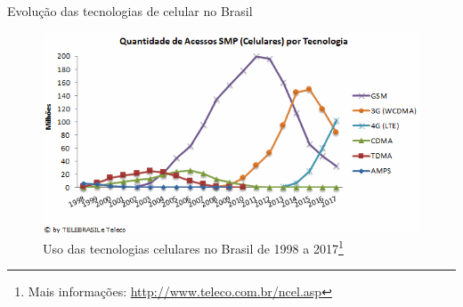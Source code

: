 \documentclass[10pt,aspectratio=169]{beamer} %
\begin{document}
\begin{frame}{Evolução das tecnologias de celular no Brasil}
\begin{figure}[!htb]
    \centering
    \includegraphics[scale=0.45]{LRCgraphics/tecnocel2017_teleco.png}
    \caption{Uso das tecnologias celulares no Brasil de 1998 a 2017\footnote{Mais informações: \url{http://www.teleco.com.br/ncel.asp}}}
\end{figure}
\end{frame}
\end{document}

